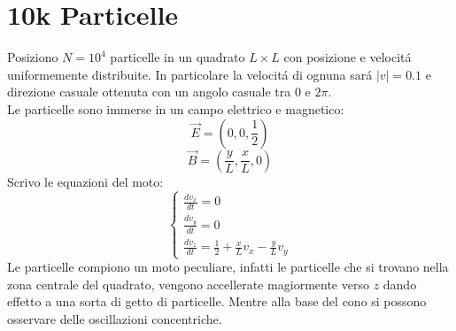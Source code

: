 \section{10k Particelle}
Posiziono $N = 10^4 $ particelle in un quadrato $L \times L$ con posizione e velocitá uniformemente distribuite. In particolare la velocitá di ognuna sará $|v|=0.1$ e direzione casuale ottenuta con un angolo casuale tra $0$ e $2\pi$.\\
Le particelle sono immerse in un campo elettrico e magnetico:
$$\vec{E}=\left(0,0,\frac{1}{2} \right)$$
$$\vec{B}=\left(\frac{y}{L},\frac{x}{L},0\right) $$ 
Scrivo le equazioni del moto:
$$
\begin{cases} 
\frac{dv_x}{dt}= 0 \\ 
\frac{dv_y}{dt}= 0 \\ 
\frac{dv_z}{dt}= \frac{1}{2} + \frac{x}{L}v_x - \frac{y}{L}v_y 
\end{cases}
$$
Le particelle compiono un moto peculiare, infatti le particelle che si trovano nella zona centrale del quadrato, vengono accellerate magiormente verso $z$ dando effetto a una sorta di getto di particelle. Mentre alla base del cono si possono osservare delle oscillazioni concentriche.


